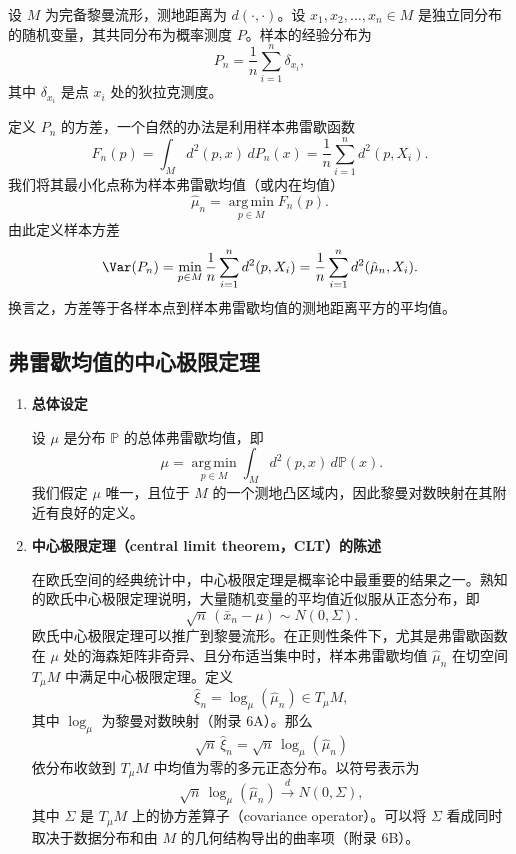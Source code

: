 设 $M$ 为完备黎曼流形，测地距离为 $d(\cdot,\cdot)$。设 $x_1,x_2,\ldots,x_n\in M$ 是独立同分布的随机变量，其共同分布为概率测度 $P$。样本的经验分布为
\[
  P_n=\frac{1}{n}\sum_{i=1}^{n}\delta_{x_i},
\]
其中 $\delta_{x_i}$ 是点 $x_i$ 处的狄拉克测度。

定义 $P_n$ 的方差，一个自然的办法是利用样本弗雷歇函数
\[
  F_n(p)=\int_M d^2(p,x)\,dP_n(x)
        =\frac{1}{n}\sum_{i=1}^{n} d^2(p,X_i).
\]
我们将其最小化点称为样本弗雷歇均值（或内在均值）
\[
  \hat\mu_n=\operatorname*{arg\,min}_{p\in M}F_n(p).
\]
由此定义样本方差
\[
  \Var(P_n)=\min_{p\in M}\frac{1}{n}\sum_{i=1}^{n}d^2(p,X_i)
           =\frac{1}{n}\sum_{i=1}^{n}d^2(\hat\mu_n,X_i).
\]
换言之，方差等于各样本点到样本弗雷歇均值的测地距离平方的平均值。

\subsection{弗雷歇均值的中心极限定理}

\begin{enumerate}[label=\alph*.]
  \item \textbf{总体设定}\par
  设 $\mu$ 是分布 $\mathbb P$ 的总体弗雷歇均值，即
  \[
    \mu=\operatorname*{arg\,min}_{p\in M}\int_M d^2(p,x)\,d\mathbb P(x).
  \]
  我们假定 $\mu$ 唯一，且位于 $M$ 的一个测地凸区域内，因此黎曼对数映射在其附近有良好的定义。
  \item \textbf{中心极限定理（central limit theorem，CLT）的陈述}\par
  在欧氏空间的经典统计中，中心极限定理是概率论中最重要的结果之一。熟知的欧氏中心极限定理说明，大量随机变量的平均值近似服从正态分布，即
  \[
    \sqrt n\,(\bar x_n-\mu)\sim N(0,\Sigma).
  \]
  欧氏中心极限定理可以推广到黎曼流形。在正则性条件下，尤其是弗雷歇函数在 $\mu$ 处的海森矩阵非奇异、且分布适当集中时，样本弗雷歇均值 $\hat\mu_n$ 在切空间 $T_\mu M$ 中满足中心极限定理。定义
  \[
    \hat\xi_n=\log_\mu(\hat\mu_n)\in T_\mu M,
  \]
  其中 $\log_\mu$ 为黎曼对数映射（附录 6A）。那么
  \[
    \sqrt n\,\hat\xi_n=\sqrt n\,\log_\mu(\hat\mu_n)
  \]
  依分布收敛到 $T_\mu M$ 中均值为零的多元正态分布。以符号表示为
  \[
    \sqrt n\,\log_\mu(\hat\mu_n)\xrightarrow{d}N(0,\Sigma),
  \]
  其中 $\Sigma$ 是 $T_\mu M$ 上的协方差算子（covariance operator）。可以将 $\Sigma$ 看成同时取决于数据分布和由 $M$ 的几何结构导出的曲率项（附录 6B）。
\end{enumerate}

